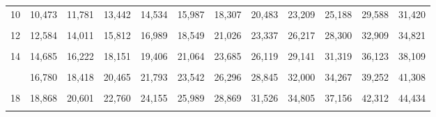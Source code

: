 \documentclass[
  ngerman,
]{article}
\begin{document}
\begin{table}[!h]
{\begin{tabular}{>{}r|rrrrrrrrrrr}
10 & 10,473 & 11,781 & 13,442 & 14,534 & 15,987 & 18,307 & 20,483 & 23,209 & 25,188 & 29,588 & 31,420\\
\addlinespace
\cellcolor{gray!6}{11} & \cellcolor{gray!6}{11,530} & \cellcolor{gray!6}{12,899} & \cellcolor{gray!6}{14,631} & \cellcolor{gray!6}{15,767} & \cellcolor{gray!6}{17,275} & \cellcolor{gray!6}{19,675} & \cellcolor{gray!6}{21,920} & \cellcolor{gray!6}{24,725} & \cellcolor{gray!6}{26,757} & \cellcolor{gray!6}{31,264} & \cellcolor{gray!6}{33,137}\\
12 & 12,584 & 14,011 & 15,812 & 16,989 & 18,549 & 21,026 & 23,337 & 26,217 & 28,300 & 32,909 & 34,821\\
\cellcolor{gray!6}{13} & \cellcolor{gray!6}{13,636} & \cellcolor{gray!6}{15,119} & \cellcolor{gray!6}{16,985} & \cellcolor{gray!6}{18,202} & \cellcolor{gray!6}{19,812} & \cellcolor{gray!6}{22,362} & \cellcolor{gray!6}{24,736} & \cellcolor{gray!6}{27,688} & \cellcolor{gray!6}{29,819} & \cellcolor{gray!6}{34,528} & \cellcolor{gray!6}{36,478}\\
14 & 14,685 & 16,222 & 18,151 & 19,406 & 21,064 & 23,685 & 26,119 & 29,141 & 31,319 & 36,123 & 38,109\\
\cellcolor{gray!6}{15} & \cellcolor{gray!6}{15,733} & \cellcolor{gray!6}{17,322} & \cellcolor{gray!6}{19,311} & \cellcolor{gray!6}{20,603} & \cellcolor{gray!6}{22,307} & \cellcolor{gray!6}{24,996} & \cellcolor{gray!6}{27,488} & \cellcolor{gray!6}{30,578} & \cellcolor{gray!6}{32,801} & \cellcolor{gray!6}{37,697} & \cellcolor{gray!6}{39,719}\\
\addlinespace
16 & 16,780 & 18,418 & 20,465 & 21,793 & 23,542 & 26,296 & 28,845 & 32,000 & 34,267 & 39,252 & 41,308\\
\cellcolor{gray!6}{17} & \cellcolor{gray!6}{17,824} & \cellcolor{gray!6}{19,511} & \cellcolor{gray!6}{21,615} & \cellcolor{gray!6}{22,977} & \cellcolor{gray!6}{24,769} & \cellcolor{gray!6}{27,587} & \cellcolor{gray!6}{30,191} & \cellcolor{gray!6}{33,409} & \cellcolor{gray!6}{35,718} & \cellcolor{gray!6}{40,790} & \cellcolor{gray!6}{42,879}\\
18 & 18,868 & 20,601 & 22,760 & 24,155 & 25,989 & 28,869 & 31,526 & 34,805 & 37,156 & 42,312 & 44,434\\
\cellcolor{gray!6}{19} & \cellcolor{gray!6}{19,910} & \cellcolor{gray!6}{21,689} & \cellcolor{gray!6}{23,900} & \cellcolor{gray!6}{25,329} & \cellcolor{gray!6}{27,204} & \cellcolor{gray!6}{30,144} & \cellcolor{gray!6}{32,852} & \cellcolor{gray!6}{36,191} & \cellcolor{gray!6}{38,582} & \cellcolor{gray!6}{43,820} & \cellcolor{gray!6}{45,973}\\

\end{tabular}}
\end{table}
\end{document}
